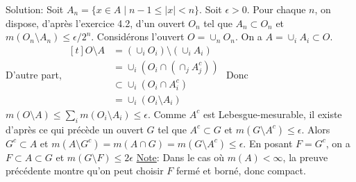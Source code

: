 \documentclass{report}
\begin{document}
Solution: Soit $A_n = \{x\in A\; | \; n-1\leq \left|x\right|<n\}$. Soit $\epsilon>0$. Pour chaque $n$, on dispose, d'après l'exercice 4.2, d'un ouvert $O_n$ tel que $A_n \subset O_n$ et $m(O_n\setminus A_n)\leq \epsilon/2^n$. Considérons l'ouvert $O = \cup_n O_n$. On a $A = \cup_i A_i \subset O$. \newline
D'autre part, $\begin{aligned}[t] O\setminus A &= \left(\cup_i O_i \right)\setminus \left(\cup_i A_i\right) \\ &= \cup_i \left(O_i \cap \left(\cap_j A_j^c \right) \right)\\ &\subset \cup_i \left(O_i \cap A_i^c \right)\\ &= \cup_i \left( O_i \setminus A_i\right) \end{aligned}$\newline \newline
Donc $m(O\setminus A) \leq \sum_i m(O_i\setminus A_i)\leq \epsilon$. \newline \newline
Comme $A^c$ est Lebesgue-mesurable, il existe d'après ce qui précède un ouvert $G$ tel que $A^c\subset G$ et $m(G\setminus A^c)\leq \epsilon $. Alors $G^c \subset A$ et $m(A\setminus G^c) = m(A\cap G)  = m(G \setminus A^c) \leq \epsilon $. \newline
En posant $F = G^c$, on a $F\subset A \subset G$ et $m(G\setminus F)\leq 2\epsilon$ \newline \newline
\underline{Note}: Dans le cas où $m(A)<\infty$, la preuve précédente montre qu'on peut choisir $F$ fermé et borné, donc compact.


\newpage
 \subsection{}  \\ \\
\end{document}
